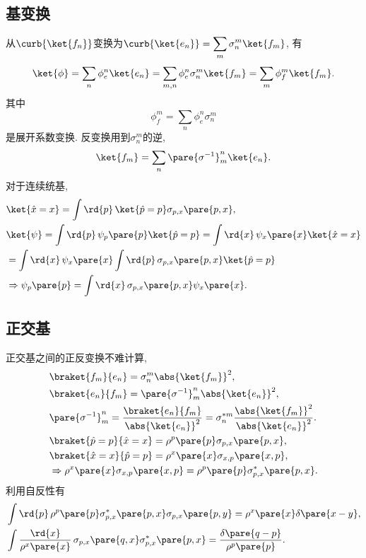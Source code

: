 \documentclass[hidelinks]{ctexart}
\begin{document}

\subsection{基变换} %
\label{sub:基变换}

\newpoint{}从$\curb{\ket{f_n}}$变换为$\curb{\ket{e_n}} = \displaystyle \sum_m \sigma_n^m \ket{f_m}$, 有
\[ \ket{\phi} = \sum_n \phi_e^n \ket{e_n} = \sum_{m,n} \phi_e^n \sigma_n^m \ket{f_m} = \sum_{m}\phi_f^m \ket{f_m}. \]
其中
\[ \phi_f^m = \sum_n \phi_e^n \sigma_n^m \]
是展开系数变换.
\newpoint{}反变换用到$\sigma_n^m$的逆,
\[ \ket{f_m} = \sum_n \pare{\sigma^{-1}}_m^n \ket{e_n}. \]
\newpoint{}对于连续统基,
\begin{align*}
    & \ket{\hat x=x} = \int \rd{p}\,\ket{\hat p = p}\sigma_{p,x}\pare{p,x}, \\
    & \ket{\psi} = \int \rd{p}\, \psi_p\pare{p}\ket{\hat p = p} = \int \rd{x}\,\psi_x\pare{x}\ket{\hat x = x} \\
    &= \int \rd{x}\, \psi_x\pare{x} \int \rd{p}\, \sigma_{p,x}\pare{p,x}\ket{\hat p = p} \\
    & \Rightarrow \psi_p\pare{p} = \int \rd{x}\, \sigma_{p,x}\pare{p,x}\psi_x\pare{x}.
\end{align*}


\subsection{正交基} %
\label{sub:正交基}

\newpoint{}正交基之间的正反变换不难计算,
\begin{align*}
    & \braket{f_m}{e_n} = \sigma_n^m \abs{\ket{f_m}}^2, \\
    & \braket{e_n}{f_m} = \pare{\sigma^{-1}}_m^n\abs{\ket{e_n}}^2, \\
    & \pare{\sigma^{-1}}_m^n = \frac{\braket{e_n}{f_m}}{\abs{\ket{e_n}}^2} = \sigma^{*m}_n \frac{\abs{\ket{f_m}}^2}{\abs{\ket{e_n}}^2}. \\
    & \braket{\hat p = p}{\hat x = x} = \rho^p\pare{p}\sigma_{p,x}\pare{p,x}, \\
    & \braket{\hat x = x}{\hat p = p} = \rho^x\pare{x}\sigma_{x,p}\pare{x,p}, \\
    & \Rightarrow \rho^x\pare{x} \sigma_{x,p}\pare{x,p} = \rho^p\pare{p}\sigma^*_{p,x}\pare{p,x}. 
\end{align*}
\newpoint{}利用自反性有
\begin{align*}
    & \int \rd{p}\, \rho^p\pare{p} \sigma^*_{p,x}\pare{p,x}\sigma_{p,x}\pare{p,y} = \rho^x\pare{x}\delta\pare{x-y}, \\
    & \int \frac{\rd{x}}{\rho^x\pare{x}}\,\sigma_{p,x}\pare{q,x}\sigma^*_{p,x}\pare{p,x} = \frac{\delta\pare{q-p}}{\rho^p\pare{p}}.
\end{align*}
\end{document}
